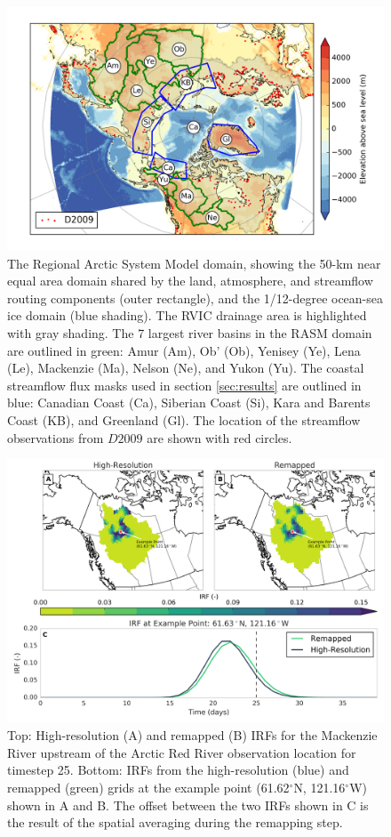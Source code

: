 \documentclass[jgrga, draft]{agutex}
\begin{document}
\clearpage
\begin{figure}
\noindent\includegraphics[width=40pc,natwidth=1]{RASM_domain_fig}
\caption{The Regional Arctic System Model domain, showing the 50-km near equal area domain shared by the land, atmosphere, and streamflow routing components (outer rectangle), and the 1/12-degree ocean-sea ice domain (blue shading).
The RVIC drainage area is highlighted with gray shading.
The 7 largest river basins in the RASM domain are outlined in green: Amur (Am), Ob' (Ob), Yenisey (Ye), Lena (Le), Mackenzie (Ma), Nelson (Ne), and Yukon (Yu).
The coastal streamflow flux masks used in section \ref{sec:results} are outlined in blue: Canadian Coast (Ca), Siberian Coast (Si), Kara and Barents Coast (KB), and Greenland (Gl).
The location of the streamflow observations from $D2009$ are shown with red circles. }
\label{fig:rasm_domain}
\end{figure}

\clearpage
\begin{figure}
\noindent\includegraphics[width=40pc,natwidth=1]{uh_remap_schematic}
\caption{Top: High-resolution (A) and remapped (B) IRFs for the Mackenzie River upstream of the Arctic Red River observation location for timestep 25.
Bottom: IRFs from the high-resolution (blue) and remapped (green) grids at the example point (61.62$^\circ$N, 121.16$^\circ$W) shown in A and B.
The offset between the two IRFs shown in C is the result of the spatial averaging during the remapping step.}
\label{fig:uh_remap_schematic}
\end{figure}
\end{document}

